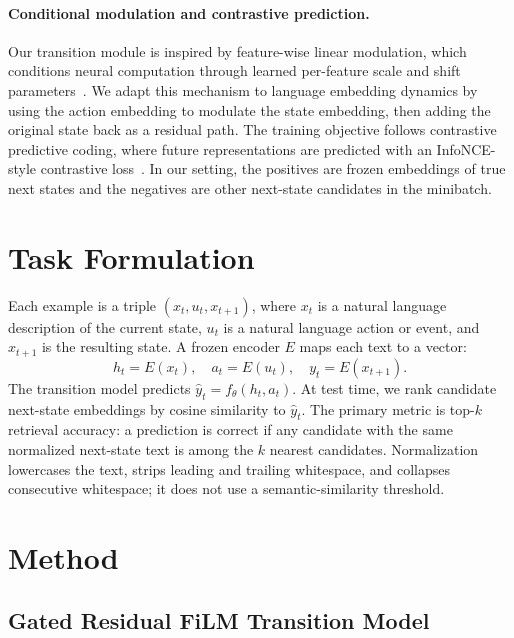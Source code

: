 \documentclass{article}
\begin{document}
\paragraph{Conditional modulation and contrastive prediction.}
Our transition module is inspired by feature-wise linear modulation, which conditions neural computation through learned per-feature scale and shift parameters~\citep{perez2017film}. We adapt this mechanism to language embedding dynamics by using the action embedding to modulate the state embedding, then adding the original state back as a residual path. The training objective follows contrastive predictive coding, where future representations are predicted with an InfoNCE-style contrastive loss~\citep{oord2018cpc}. In our setting, the positives are frozen embeddings of true next states and the negatives are other next-state candidates in the minibatch.

\section{Task Formulation}

Each example is a triple $(x_t, u_t, x_{t+1})$, where $x_t$ is a natural language description of the current state, $u_t$ is a natural language action or event, and $x_{t+1}$ is the resulting state. A frozen encoder $E$ maps each text to a vector:
\begin{equation}
  h_t = E(x_t), \quad a_t = E(u_t), \quad y_t = E(x_{t+1}).
\end{equation}
The transition model predicts $\hat{y}_t = f_\theta(h_t, a_t)$. At test time, we rank candidate next-state embeddings by cosine similarity to $\hat{y}_t$. The primary metric is top-$k$ retrieval accuracy: a prediction is correct if any candidate with the same normalized next-state text is among the $k$ nearest candidates. Normalization lowercases the text, strips leading and trailing whitespace, and collapses consecutive whitespace; it does not use a semantic-similarity threshold.

\section{Method}
\label{sec:method}

\subsection{Gated Residual FiLM Transition Model}
\end{document}
